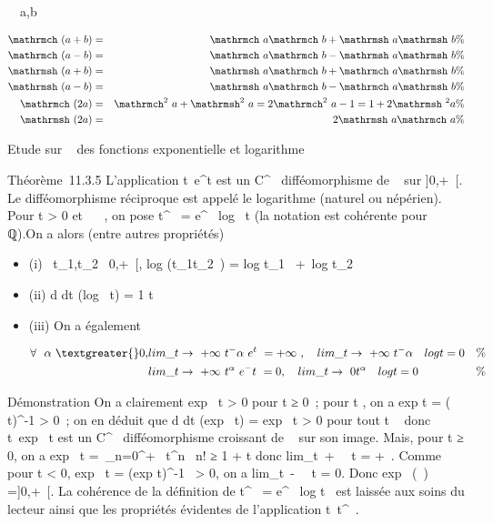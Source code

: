 \documentclass[]{article}
\begin{document}
\forall~~a,b \in {}

\begin{align*}
\mathrmch~ (a + b)& =&
\mathrmch~
a\mathrmch~ b
+ \mathrmsh~
a\mathrmsh~ b \%&
\\
\mathrmch~ (a - b)& =&
\mathrmch~
a\mathrmch~ b
-\mathrmsh~
a\mathrmsh~ b \%&
\\
\mathrmsh~ (a + b)& =&
\mathrmsh~
a\mathrmch~ b
+ \mathrmch~
a\mathrmsh~ b \%&
\\
\mathrmsh~ (a - b)& =&
\mathrmsh~
a\mathrmch~ b
-\mathrmch~
a\mathrmsh~ b \%&
\\
\mathrmch~ (2a)& =&
\mathrmch ^2~a
+ \mathrmsh ^2~a
= 2\mathrmch ^2~a
- 1 = 1 + 2\mathrmsh~
^2a\%& \\
\mathrmsh~ (2a)& =&
2\mathrmsh~
a\mathrmch~ a \%&
\\ \end{align*}

Etude sur ~ des fonctions exponentielle et logarithme

Théorème~11.3.5 L'application
t\mapsto~e^t est un C^\infty~
difféomorphisme de ~ sur {]}0,+\infty~{[}. Le difféomorphisme réciproque est
appelé le logarithme (naturel ou népérien). Pour t \textgreater{} 0 et \alpha~
\in {}~, on pose t^\alpha~ = e^\alpha~ log~
t (la notation est cohérente pour \alpha~ \in ℚ).On a alors (entre autres
propriétés)

\begin{itemize}
\item
  (i) \forall~t\_1,t\_2~ \in{]}0,+\infty~{[},
  log (t\_1t\_2~)
  = log t\_1~ +\
  log t\_2
\item
  (ii)  d \over dt (log~ t)
  = 1 \over t
\item
  (iii) On a également

  \begin{align*} \forall~~\alpha~
  \textgreater{} 0, &
  lim\_t\rightarrow~+\infty~t^-\alpha~e^t~
  = +\infty~,\quad
  lim\_t\rightarrow~+\infty~t^-\alpha~~\
  log t = 0& \%& \\ &
  lim\_t\rightarrow~+\infty~t^\alpha~e^-t~
  = 0,\quad
  lim\_t\rightarrow~0t^\alpha~~\
  log t = 0 & \%& \\
  \end{align*}
\end{itemize}

Démonstration On a clairement exp~ t
\textgreater{} 0 pour t ≥ 0~; pour t , on a
exp t = (\exp~
\textbar{}t\textbar{})^-1 \textgreater{} 0~; on en déduit que
 d \over dt (exp~ t)
= exp~ t \textgreater{} 0 pour tout t \in {}~ donc
t\mapsto~exp~ t est un
C^\infty~ difféomorphisme croissant de ~ sur son image. Mais, pour
t ≥ 0, on a exp~ t =\
\sum  \_n=0^+\infty~ t^n~
\over n! ≥ 1 + t donc
lim\_t\rightarrow~+\infty~\exp~
t = +\infty~. Comme pour t \textless{} 0, exp~ t =
(exp \textbar{}t\textbar{})^-1~
\textgreater{} 0, on a
lim\_t\rightarrow~-\infty~\exp~
t = 0. Donc exp~ (\mathbb{R}~) ={]}0,+\infty~{[}. La cohérence
de la définition de t^\alpha~ =
e^\alpha~ log t~ est laissée aux soins du
lecteur ainsi que les propriétés évidentes de l'application
t\mapsto~t^\alpha~.
\end{document}
